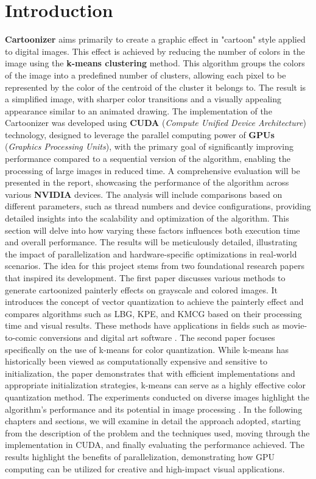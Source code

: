 \chapter{Introduction}
\textbf{Cartoonizer} aims primarily to create a graphic effect in "cartoon" style applied to digital images. This effect is achieved by reducing the number of colors in the image using the \textbf{k-means clustering} method. This algorithm groups the colors of the image into a predefined number of clusters, allowing each pixel to be represented by the color of the centroid of the cluster it belongs to. The result is a simplified image, with sharper color transitions and a visually appealing appearance similar to an animated drawing.
The implementation of the Cartoonizer was developed using \textbf{CUDA} (\textit{Compute Unified Device Architecture}) technology, designed to leverage the parallel computing power of \textbf{GPUs} (\textit{Graphics Processing Units}), with the primary goal of significantly improving performance compared to a sequential version of the algorithm, enabling the processing of large images in reduced time.
A comprehensive evaluation will be presented in the report, showcasing the performance of the algorithm across various \textbf{NVIDIA} devices. The analysis will include comparisons based on different parameters, such as thread numbers and device configurations, providing detailed insights into the scalability and optimization of the algorithm. This section will delve into how varying these factors influences both execution time and overall performance. The results will be meticulously detailed, illustrating the impact of parallelization and hardware-specific optimizations in real-world scenarios.
The idea for this project stems from two foundational research papers that inspired its development. The first paper discusses various methods to generate cartoonized painterly effects on grayscale and colored images. It introduces the concept of vector quantization to achieve the painterly effect and compares algorithms such as LBG, KPE, and KMCG based on their processing time and visual results. These methods have applications in fields such as movie-to-comic conversions and digital art software \cite{image_cartoonization_methods}.
The second paper focuses specifically on the use of k-means for color quantization. While k-means has historically been viewed as computationally expensive and sensitive to initialization, the paper demonstrates that with efficient implementations and appropriate initialization strategies, k-means can serve as a highly effective color quantization method. The experiments conducted on diverse images highlight the algorithm’s performance and its potential in image processing \cite{improving_k_means}.
In the following chapters and sections, we will examine in detail the approach adopted, starting from the description of the problem and the techniques used, moving through the implementation in CUDA, and finally evaluating the performance achieved. The results highlight the benefits of parallelization, demonstrating how GPU computing can be utilized for creative and high-impact visual applications.


